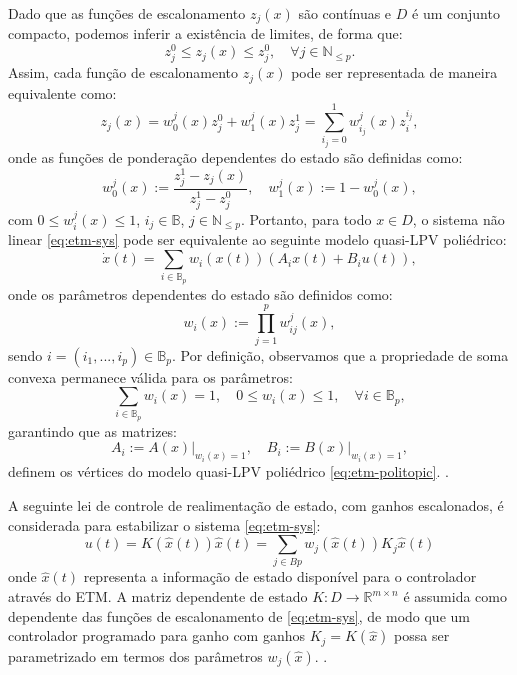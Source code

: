 Dado que as funções de escalonamento $z_j(x)$ são contínuas e $D$ é um conjunto compacto, podemos inferir a existência de limites, de forma que: \begin{equation} z_{j}^0 \leq z_j(x) \leq z_{j}^0, \quad \forall j \in \mathbb{N}_{\leq p}. \end{equation} Assim, cada função de escalonamento $z_j(x)$ pode ser representada de maneira equivalente como: \begin{equation} z_j(x) = w_0^j(x)z_j^0 + w_{1}^j(x)z_{j}^1 = \sum_{i_j=0}^{1} w_{i_j}^j(x)z_i^{i_j}, \end{equation} onde as funções de ponderação dependentes do estado são definidas como: \begin{equation} w_0^j(x) := \frac{z_j^1 - z_j(x)}{z_j^1 - z_j^0}, \quad w_1^j(x) := 1 - w_0^j(x), \end{equation} com $0 \leq w_i^j(x) \leq 1$, $i_j \in \mathbb{B}$, $j \in \mathbb{N}_{\leq p}$. Portanto, para todo $x \in D$, o sistema não linear \eqref{eq:etm-sys} pode ser equivalente ao seguinte modelo quasi-LPV poliédrico: \begin{equation} \dot{x}(t) = \sum_{i \in \mathbb{B}_p} w_i(x(t))(A_i x(t) + B_i u(t)), \label{eq:etm-politopic} \end{equation} onde os parâmetros dependentes do estado são definidos como: \begin{equation} w_i(x) := \prod_{j=1}^{p} w_{ij}^j(x), \end{equation} sendo $i = (i_1, ..., i_p) \in \mathbb{B}_p$. Por definição, observamos que a propriedade de soma convexa permanece válida para os parâmetros: \begin{equation} \sum_{i \in \mathbb{B}_p} w_i(x) = 1, \quad 0 \leq w_i(x) \leq 1, \quad \forall i \in \mathbb{B}_p, \end{equation} garantindo que as matrizes: \begin{equation} \left. A_i := A(x) \right|_{w_i(x)=1}, \quad \left.B_i := B(x) \right|_{w_i(x)=1}, \end{equation} definem os vértices do modelo quasi-LPV poliédrico \eqref{eq:etm-politopic}. \cite{coutinho2021}.

A seguinte lei de controle de realimentação de estado, com ganhos escalonados, é considerada para estabilizar o sistema \eqref{eq:etm-sys}:
\begin{equation} u(t) = K(\hat{x}(t))\hat{x}(t) = \sum_{j \in Bp} w_j(\hat{x}(t))K_j\hat{x}(t) \end{equation} onde $ \hat{x}(t) $ representa a informação de estado disponível para o controlador através do ETM. A matriz dependente de estado $ K : D \rightarrow \mathbb{R}^{m \times n} $ é assumida como dependente das funções de escalonamento de \eqref{eq:etm-sys}, de modo que um controlador programado para ganho com ganhos $ K_j = K(\hat{x}) $ possa ser parametrizado em termos dos parâmetros $ w_j(\hat{x}) $. \cite{coutinho2021}.

